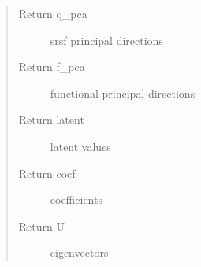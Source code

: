 \documentclass[letterpaper,10pt,english]{sphinxmanual}
\begin{document}
\begin{fulllineitems}
\begin{quote}
\begin{description}
\item[{Return q\_pca}] \leavevmode
srsf principal directions

\item[{Return f\_pca}] \leavevmode
functional principal directions

\item[{Return latent}] \leavevmode
latent values

\item[{Return coef}] \leavevmode
coefficients

\item[{Return U}] \leavevmode
eigenvectors

\end{description}\end{quote}

\end{fulllineitems}

\end{document}
